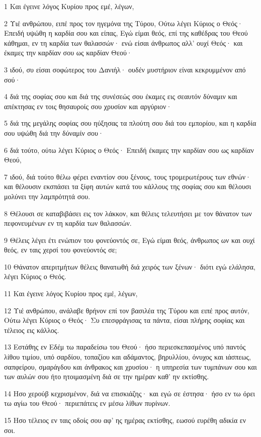 \par 1 Και έγεινε λόγος Κυρίου προς εμέ, λέγων,
\par 2 Υιέ ανθρώπου, ειπέ προς τον ηγεμόνα της Τύρου, Ούτω λέγει Κύριος ο Θεός· Επειδή υψώθη η καρδία σου και είπας, Εγώ είμαι θεός, επί της καθέδρας του Θεού κάθημαι, εν τη καρδία των θαλασσών· ενώ είσαι άνθρωπος αλλ' ουχί Θεός· και έκαμες την καρδίαν σου ως καρδίαν Θεού·
\par 3 ιδού, συ είσαι σοφώτερος του Δανιήλ· ουδέν μυστήριον είναι κεκρυμμένον από σού·
\par 4 διά της σοφίας σου και διά της συνέσεώς σου έκαμες εις σεαυτόν δύναμιν και απέκτησας εν τοις θησαυροίς σου χρυσίον και αργύριον·
\par 5 διά της μεγάλης σοφίας σου ηύξησας τα πλούτη σου διά του εμπορίου, και η καρδία σου υψώθη διά την δύναμίν σου·
\par 6 διά τούτο, ούτω λέγει Κύριος ο Θεός· Επειδή έκαμες την καρδίαν σου ως καρδίαν Θεού,
\par 7 ιδού, διά τούτο θέλω φέρει εναντίον σου ξένους, τους τρομερωτέρους των εθνών· και θέλουσιν εκσπάσει τα ξίφη αυτών κατά του κάλλους της σοφίας σου και θέλουσι μολύνει την λαμπρότητά σου.
\par 8 Θέλουσι σε καταβιβάσει εις τον λάκκον, και θέλεις τελευτήσει με τον θάνατον των πεφονευμένων εν τη καρδία των θαλασσών.
\par 9 Θέλεις λέγει έτι ενώπιον του φονεύοντός σε, Εγώ είμαι θεός, άνθρωπος ων και ουχί θεός, εν ταις χερσί του φονεύοντός σε;
\par 10 Θάνατον απεριτμήτων θέλεις θανατωθή διά χειρός των ξένων· διότι εγώ ελάλησα, λέγει Κύριος ο Θεός.
\par 11 Και έγεινε λόγος Κυρίου προς εμέ, λέγων,
\par 12 Υιέ ανθρώπου, ανάλαβε θρήνον επί τον βασιλέα της Τύρου και ειπέ προς αυτόν, Ούτω λέγει Κύριος ο Θεός· Συ επεσφράγισας τα πάντα, είσαι πλήρης σοφίας και τέλειος εις κάλλος.
\par 13 Εστάθης εν Εδέμ τω παραδείσω του Θεού· ήσο περιεσκεπασμένος υπό παντός λίθου τιμίου, υπό σαρδίου, τοπαζίου και αδάμαντος, βηρυλλίου, όνυχος και ιάσπεως, σαπφείρου, σμαράγδου και άνθρακος και χρυσίου· η υπηρεσία των τυμπάνων σου και των αυλών σου ήτο ητοιμασμένη διά σε την ημέραν καθ' ην εκτίσθης.
\par 14 Ησο χερούβ κεχρισμένον, διά να επισκιάζης· και εγώ σε έστησα· ήσο εν τω όρει τω αγίω του Θεού· περιεπάτεις εν μέσω λίθων πυρίνων.
\par 15 Ησο τέλειος εν ταις οδοίς σου αφ' ης ημέρας εκτίσθης, εωσού ευρέθη αδικία εν σοι.

